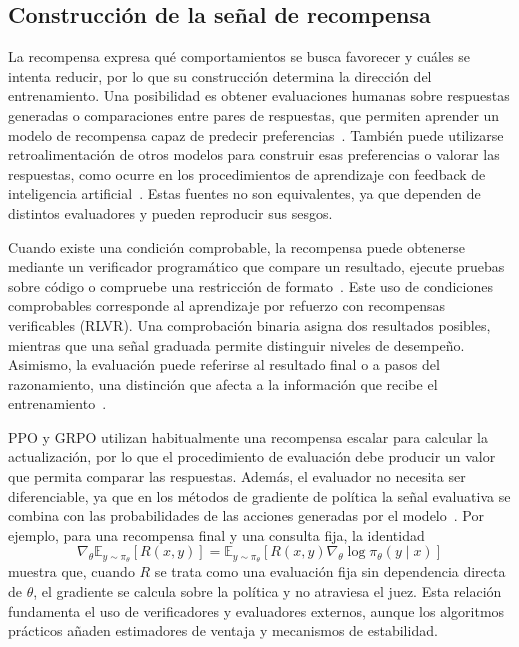 \subsection{Construcción de la señal de recompensa}
\label{sec:senal-recompensa}
La recompensa expresa qué comportamientos se busca favorecer y cuáles se intenta reducir, por lo que su construcción determina la dirección del entrenamiento. Una posibilidad es obtener evaluaciones humanas sobre respuestas generadas o comparaciones entre pares de respuestas, que permiten aprender un modelo de recompensa capaz de predecir preferencias~\cite{christiano2017preferences,ouyang2022instructgpt}. También puede utilizarse retroalimentación de otros modelos para construir esas preferencias o valorar las respuestas, como ocurre en los procedimientos de aprendizaje con feedback de inteligencia artificial~\cite{bai2022constitutional}. Estas fuentes no son equivalentes, ya que dependen de distintos evaluadores y pueden reproducir sus sesgos.

Cuando existe una condición comprobable, la recompensa puede obtenerse mediante un verificador programático que compare un resultado, ejecute pruebas sobre código o compruebe una restricción de formato~\cite{deepseek2025r1}. Este uso de condiciones comprobables corresponde al aprendizaje por refuerzo con recompensas verificables (RLVR). Una comprobación binaria asigna dos resultados posibles, mientras que una señal graduada permite distinguir niveles de desempeño. Asimismo, la evaluación puede referirse al resultado final o a pasos del razonamiento, una distinción que afecta a la información que recibe el entrenamiento~\cite{lightman2023verify}.

PPO y GRPO utilizan habitualmente una recompensa escalar para calcular la actualización, por lo que el procedimiento de evaluación debe producir un valor que permita comparar las respuestas. Además, el evaluador no necesita ser diferenciable, ya que en los métodos de gradiente de política la señal evaluativa se combina con las probabilidades de las acciones generadas por el modelo~\cite{sutton2018reinforcement}. Por ejemplo, para una recompensa final y una consulta fija, la identidad
\begin{equation}
\nabla_\theta\mathbb{E}_{y\sim\pi_\theta}[R(x,y)]
=\mathbb{E}_{y\sim\pi_\theta}
[R(x,y)\nabla_\theta\log\pi_\theta(y\mid x)]
\label{eq:gradiente-politica}
\end{equation}
muestra que, cuando $R$ se trata como una evaluación fija sin dependencia directa de $\theta$, el gradiente se calcula sobre la política y no atraviesa el juez. Esta relación fundamenta el uso de verificadores y evaluadores externos, aunque los algoritmos prácticos añaden estimadores de ventaja y mecanismos de estabilidad.

